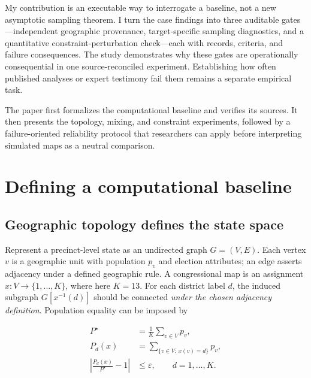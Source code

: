 \documentclass[
  10pt,
]{article}
\begin{document}
My contribution is an executable way to interrogate a baseline, not a
new asymptotic sampling theorem. I turn the case findings into three
auditable gates---independent geographic provenance, target-specific
sampling diagnostics, and a quantitative constraint-perturbation
check---each with records, criteria, and failure consequences. The study
demonstrates why these gates are operationally consequential in one
source-reconciled experiment. Establishing how often published analyses
or expert testimony fail them remains a separate empirical task.

The paper first formalizes the computational baseline and verifies its
sources. It then presents the topology, mixing, and constraint
experiments, followed by a failure-oriented reliability protocol that
researchers can apply before interpreting simulated maps as a neutral
comparison.

\hypertarget{defining-a-computational-baseline}{%
\section{Defining a computational
baseline}\label{defining-a-computational-baseline}}

\hypertarget{geographic-topology-defines-the-state-space}{%
\subsection{Geographic topology defines the state
space}\label{geographic-topology-defines-the-state-space}}

Represent a precinct-level state as an undirected graph \(G=(V,E)\).
Each vertex \(v\) is a geographic unit with population \(p_v\) and
election attributes; an edge asserts adjacency under a defined
geographic rule. A congressional map is an assignment
\(x:V\rightarrow\{1,\ldots,K\}\), where here \(K=13\). For each district
label \(d\), the induced subgraph \(G[x^{-1}(d)]\) should be connected
\emph{under the chosen adjacency definition}. Population equality can be
imposed by

\begin{equation}
\begin{aligned}
P^{\star} &= \frac{1}{K}\sum_{v\in V}p_v, \\
P_d(x) &= \sum_{\{v\in V:\,x(v)=d\}}p_v,\\
\left|\frac{P_d(x)}{P^{\star}}-1\right| &\leq \varepsilon,
\qquad d=1,\ldots,K.
\end{aligned}
\end{equation}
\end{document}
